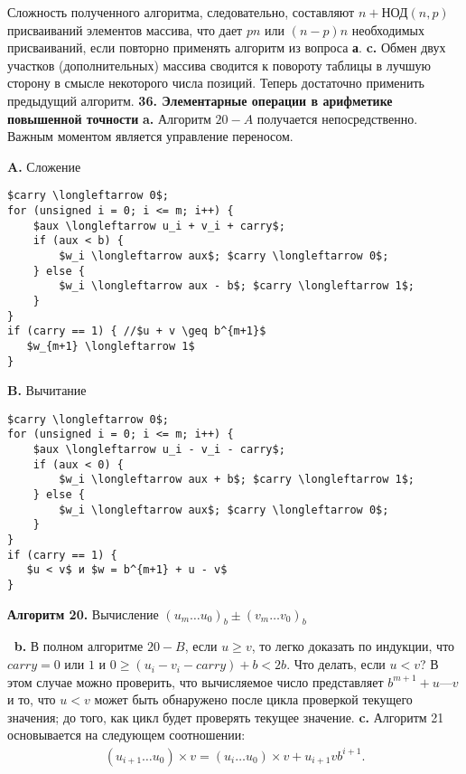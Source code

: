 \documentclass{../../template/mai_book}
\begin{document}
\newpage
Сложность полученного алгоритма, следовательно, составляют $n + \text{НОД}(n,p)$ присваиваний элементов массива, что дает $pn$ или $(n - p)n$ необходимых присваиваний, если повторно применять алгоритм из во­проса \textbf{а}.
\newline \newline \indent
\textbf{c.} Обмен двух участков (дополнительных) массива сводится к по­вороту таблицы в лучшую сторону в смысле некоторого числа позиций. Теперь достаточно применить предыдущий алгоритм.
\newline \newline
\textbf{36. Элементарные операции в арифметике повышенной точности}
\newline \newline \indent
\textbf{a.} Алгоритм $20-A$ получается непосредственно. Важным моментом
является управление переносом.
\begin{multicols}{2}
\begin{center}
\textbf{A.} Сложение
\end{center}
{\begin{lstlisting}[mathescape=true]
$carry \longleftarrow 0$;
for (unsigned i = 0; i <= m; i++) {
    $aux \longleftarrow u_i + v_i + carry$;
    if (aux < b) {
        $w_i \longleftarrow aux$; $carry \longleftarrow 0$;   
    } else {
        $w_i \longleftarrow aux - b$; $carry \longleftarrow 1$;
    }
}
if (carry == 1) { //$u + v \geq b^{m+1}$
   $w_{m+1} \longleftarrow 1$
}
\end{lstlisting}}
\columnbreak
\begin{center}
\textbf{B.} Вычитание
\end{center}
{\begin{lstlisting}[mathescape=true]
$carry \longleftarrow 0$;
for (unsigned i = 0; i <= m; i++) {
    $aux \longleftarrow u_i - v_i - carry$;
    if (aux < 0) {
        $w_i \longleftarrow aux + b$; $carry \longleftarrow 1$;   
    } else {
        $w_i \longleftarrow aux$; $carry \longleftarrow 0$;
    }
}
if (carry == 1) {
   $u < v$ и $w = b^{m+1} + u - v$
}
\end{lstlisting}}
\end{multicols}
\begin{center}
\textbf{Алгоритм 20.} Вычисление $(u_m \dots u_0)_b \pm (v_m \dots v_0)_b$
\end{center}
$\:$ \newline
\textit{\indent}\textbf{b.} В полном алгоритме $20-B$, если $u \geq v$, то легко доказать по ин­дукции, что $carry = 0$ или $1$ и $0 \geq (u_i - v_i - carry) + b < 2b$.
\newline \indent Что делать, если $u < v$? В этом случае можно проверить, что вычисляемое число представляет $b^{m+1} + u — v$ и то, что $u < v$ может быть обнаружено после цикла проверкой текущего значения; до того, как цикл будет проверять текущее значение.
\newline \newline \indent
\textbf{c.} Алгоритм 21 основывается на следующем соотношении:
\begin{align*}
(u_{i+1} \dots u_0) \times v = (u_i \dots u_0) \times v + u_{i+1} v b^{i+1}.
\end{align*}
\end{document}
